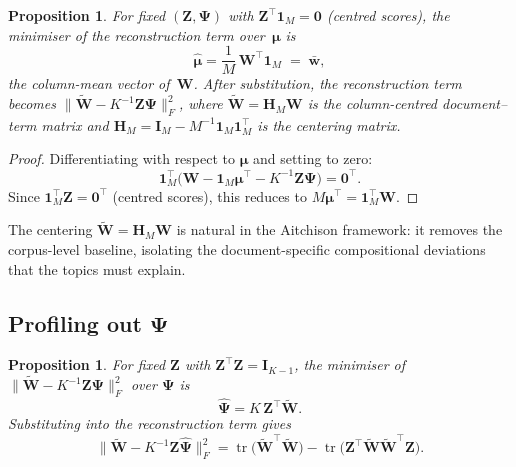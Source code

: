 \documentclass{article}
\newtheorem{proposition}[theorem]{Proposition}
\DeclareMathOperator{\tr}{tr}
\begin{document}
\begin{proposition}
\label{prop:mu_profile}
For fixed $(\mathbf{Z},\boldsymbol{\Psi})$ with
$\mathbf{Z}^{\!\top}\mathbf{1}_M = \mathbf{0}$ (centred scores), the
minimiser of the reconstruction term
over~$\boldsymbol{\mu}$ is
\begin{equation}
  \hat{\boldsymbol{\mu}}
  = \frac{1}{M}\,\mathbf{W}^{\!\top}\mathbf{1}_M
  \;=\; \bar{\mathbf{w}},
  \label{eq:mu_hat}
\end{equation}
the column-mean vector of~$\mathbf{W}$.
After substitution, the reconstruction term becomes
$\|\widetilde{\mathbf{W}} - K^{-1}\mathbf{Z}\boldsymbol{\Psi}\|_F^2$,
where $\widetilde{\mathbf{W}} = \mathbf{H}_M\mathbf{W}$ is the
column-centred document--term matrix and
$\mathbf{H}_M = \mathbf{I}_M - M^{-1}\mathbf{1}_M\mathbf{1}_M^{\!\top}$
is the centering matrix.
\end{proposition}

\begin{proof}
Differentiating with respect to $\boldsymbol{\mu}$ and setting to zero:
\[
  \mathbf{1}_M^{\!\top}
  \bigl(\mathbf{W} - \mathbf{1}_M\boldsymbol{\mu}^{\!\top}
        - K^{-1}\mathbf{Z}\boldsymbol{\Psi}\bigr) = \mathbf{0}^{\!\top}.
\]
Since $\mathbf{1}_M^{\!\top}\mathbf{Z}=\mathbf{0}^{\!\top}$ (centred
scores), this reduces to
$M\boldsymbol{\mu}^{\!\top}
 = \mathbf{1}_M^{\!\top}\mathbf{W}$.
\end{proof}

\noindent
The centering $\widetilde{\mathbf{W}} = \mathbf{H}_M\mathbf{W}$ is
natural in the Aitchison framework: it removes the corpus-level baseline,
isolating the document-specific compositional deviations that the topics
must explain.

\subsection{Profiling out
\texorpdfstring{$\boldsymbol{\Psi}$}{Psi}}
\label{subsec:profile_Psi}

\begin{proposition}
\label{prop:Psi_profile}
For fixed $\mathbf{Z}$ with
$\mathbf{Z}^{\!\top}\mathbf{Z}=\mathbf{I}_{K-1}$, the minimiser of
$\|\widetilde{\mathbf{W}} - K^{-1}\mathbf{Z}\boldsymbol{\Psi}\|_F^2$
over $\boldsymbol{\Psi}$ is
\begin{equation}
  \hat{\boldsymbol{\Psi}}
  = K\,\mathbf{Z}^{\!\top}\widetilde{\mathbf{W}}.
  \label{eq:Psi_hat}
\end{equation}
Substituting into the reconstruction term gives
\begin{equation}
  \bigl\|\widetilde{\mathbf{W}}
    - K^{-1}\mathbf{Z}\hat{\boldsymbol{\Psi}}\bigr\|_F^2
  = \tr\!\bigl(\widetilde{\mathbf{W}}^{\!\top}\widetilde{\mathbf{W}}\bigr)
    - \tr\!\bigl(
        \mathbf{Z}^{\!\top}
        \widetilde{\mathbf{W}}\widetilde{\mathbf{W}}^{\!\top}
        \mathbf{Z}
      \bigr).
  \label{eq:recon_profiled}
\end{equation}
\end{proposition}
\end{document}
